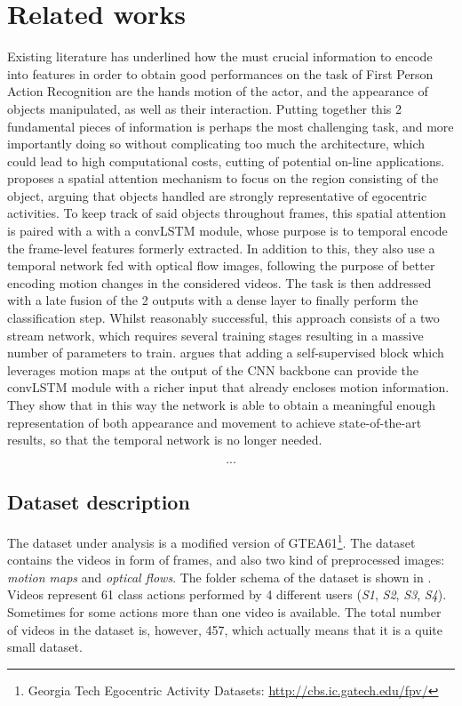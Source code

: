 \documentclass[10pt,twocolumn,hidelinks,letterpaper]{article}
\begin{document}
\section{Related works}
Existing literature has underlined how the must crucial information to encode into features in order to obtain good performances on the task of First Person Action Recognition are the hands motion of the actor, and the appearance of objects manipulated, as well as their interaction. Putting together this 2 fundamental pieces of information is perhaps the most challenging task, and more importantly doing so without complicating too much the architecture, which could lead to high computational costs, cutting of potential on-line applications. \cite{egornn} proposes a spatial attention mechanism to focus on the region consisting of the object, arguing that objects handled are strongly representative of egocentric activities. To keep track of said objects throughout frames, this spatial attention is paired with a with a convLSTM module, whose purpose is to temporal encode the frame-level features formerly extracted. In addition to this, they also use a temporal network fed with optical flow images, following the purpose of better encoding motion changes in the considered videos. The task is then addressed with a late fusion of the 2 outputs with a dense layer to finally perform the classification step. Whilst reasonably successful, this approach consists of a two stream network, which requires several training stages
resulting in a massive number of parameters to train. \cite{sparnet} argues that adding a self-supervised block which leverages motion maps at the output of the CNN backbone can provide the convLSTM module with a richer input that already encloses motion information. They show that in this way the network is able to obtain a meaningful enough representation of both appearance and movement to achieve state-of-the-art results, so that the temporal network is no longer needed. \cite{reprflow} \cite{motfilt}

\[...\]

\subsection{Dataset description}

The dataset under analysis is a modified version of GTEA61\footnote{Georgia Tech Egocentric Activity Datasets: \small{\url{http://cbs.ic.gatech.edu/fpv/}}}. The dataset contains the videos in form of frames, and also two kind of preprocessed images: \textit{motion maps} and \textit{optical flows}. The folder schema of the dataset is shown in . Videos represent 61 class actions performed by 4 different users (\textit{S1}, \textit{S2}, \textit{S3}, \textit{S4}). Sometimes for some actions more than one video is available. The total number of videos in the dataset is, however, 457, which actually means that it is a quite small dataset.
\end{document}
